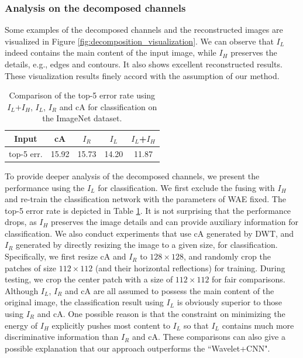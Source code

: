 \documentclass[letterpaper]{article} %
\begin{document}
\subsubsection{Analysis on the decomposed channels}
Some examples of the decomposed channels and the reconstructed images are visualized in Figure \ref{fig:decomposition_visualization}. We can observe that $I_L$ indeed contains the main content of the input image, while $I_H$ preserves the details, e.g., edges and contours. It also shows excellent reconstructed results. These visualization results finely accord with the assumption of our method.

\begin{table}[htbp]
\centering
\begin{tabular}{c|c|c|c|c}
\hline
\centering  Input  & cA & $I_R$ & $I_L$    & $I_L$+$I_H$ \\
\hline
\hline
\centering top-5 err.  & 15.92 & 15.73  & 14.20 & 11.87 \\
\hline
\end{tabular}
\caption{Comparison of the top-5 error rate using $I_L$+$I_H$, $I_L$, $I_R$ and cA for classification on the ImageNet dataset.}
\label{table:I_L}
\end{table}

To provide deeper analysis of the decomposed channels, we present the performance using the $I_L$ for classification. We first exclude the fusing with $I_H$ and re-train the classification network with the parameters of WAE fixed. The top-5 error rate is depicted in Table \ref{table:I_L}. It is not surprising that the performance drops, as $I_H$ preserves the image details and can provide auxiliary information for classification. We also conduct experiments that use cA generated by DWT, and $I_R$ generated by directly resizing the image to a given size, for classification. Specifically, we first resize cA and $I_R$ to $128 \times 128$, and randomly crop the patches of size $112 \times 112$ (and their horizontal reflections) for training. During testing, we crop the center patch with a size of $112 \times 112$ for fair comparisons. Although $I_L$, $I_R$ and cA are all assumed to possess the main content of the original image, the classification result using $I_L$ is obviously superior to those using $I_R$ and cA. One possible reason is that the constraint on minimizing the energy of $I_H$ explicitly pushes most content to $I_L$ so that $I_L$ contains much more discriminative information than $I_R$ and cA. These comparisons can also give a possible explanation that our approach outperforms the ``Wavelet+CNN".
\end{document}
